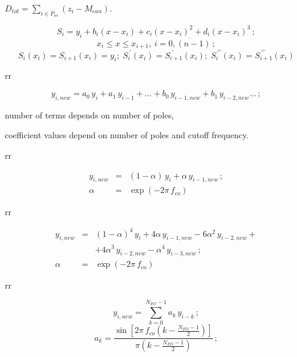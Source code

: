 \documentclass[14pt]{article}
\numberwithin{equation}{part}
\begin{document}
$D_{tot}=\sum_{i \in P_{os}} (z_i-M_{ean})$.




\begin{equation*}
    S_{i} =y_{i}+b_i(x-x_{i})+c_i(x-x_{i})^2+d_i(x-x_{i})^3\,;
\end{equation*}
\begin{equation*}
    x_{i}\leqslant x\leqslant x_{i+1}, \: i=\overline{0,(n-1)}\,;
\end{equation*}
\begin{equation*}
    S_{i}(x_i)=S_{i+1}(x_i)=y_i;\;S_{i}^{\:\prime}(x_i)=S_{i+1}^{\:\prime}(x_i);\;
    S_{i}^{\:\prime\prime}(x_i)=S_{i+1}^{\:\prime\prime}(x_i)
\end{equation*}

rr


\begin{equation*}
    y_{i,new} =a_0\,y_i+a_1\,y_{i-1}+\ldots+b_0\,y_{i-1,new}+b_1\,y_{i-2,new}\ldots\,;
\end{equation*}

\hspace{1cm}number of terms depends on number of poles,

\hspace{1cm}coefficient values depend on number of poles and cutoff frequency.


rr

\begin{eqnarray*}
  y_{i,new} &=& (1-\alpha)\,y_i+\alpha\,y_{i-1,new}\,; \\
   \alpha&=&\exp(-2\pi\,f_{co})
\end{eqnarray*}


rr

\begin{eqnarray*}
  y_{i,new} &=& (1-\alpha)^4\,y_i+4\alpha\,y_{i-1,new}-6\alpha^2\,y_{i-2,new}+ \\
   && +4\alpha^3\,y_{i-2,new}-\alpha^4\,y_{i-3,new}\,; \\
    \alpha&=&\exp(-2\pi\,f_{co})
\end{eqnarray*}


rr


\begin{equation*}
    y_{i,new} = \sum_{k=0}^{N_{FO}-1}a_k\,y_{i-k}\,;
\end{equation*}
\begin{equation*}
    a_k=\frac{\sin\left[2\pi\,f_{co}\left(k-\frac{N_{FO}-1}{2}\right)\right]}{\pi\left(k-\frac{N_{FO}-1}{2}\right)}\,;
\end{equation*}
\end{document}
